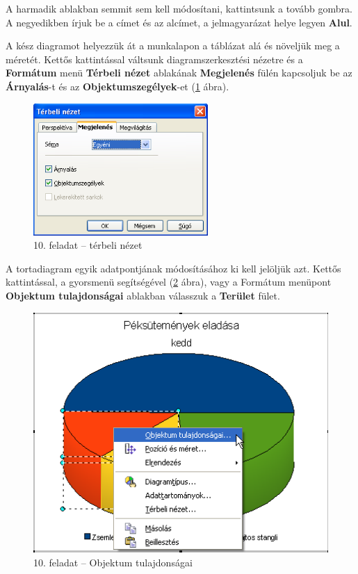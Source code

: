 A harmadik ablakban semmit sem kell módosítani, kattintsunk a
tovább gombra. A negyedikben írjuk be a címet és az alcímet,
a jelmagyarázat helye legyen \textbf{Alul}.

A kész diagramot helyezzük át a munkalapon a táblázat alá
és növeljük meg a méretét. Kettős kattintással
váltsunk diagramszerkesztési nézetre és a \textbf{Formátum}
menü \textbf{Térbeli nézet} ablakának \textbf{Megjelenés}
fülén kapcsoljuk be az \textbf{Árnyalás}-t és az
\textbf{Objektumszegélyek}-et (\ref{10-feladatTérbeli} ábra).

\begin{figure}[!h]
\begin{center}
\includegraphics[width=6.636cm]{oocalcv1-img61.png}
\caption{10.  feladat --  térbeli nézet}\label{10-feladatTérbeli}
\end{center}
\end{figure}

A tortadiagram egyik adatpontjának módosításához ki kell
jelöljük azt. Kettős kattintással, a gyorsmenü
segítségével (\ref{10-feladatObjektum} ábra), vagy a Formátum menüpont
\textbf{Objektum tulajdonságai} ablakban válasszuk a
\textbf{Terület} fület.

\begin{figure}[!h]
\begin{center}
\includegraphics[width=11.324cm]{oocalcv1-img62.png}
\caption{10. feladat --  Objektum tulajdonságai}\label{10-feladatObjektum}
\end{center}
\end{figure}

